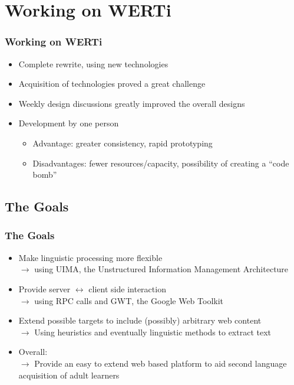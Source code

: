 \documentclass{beamer}
\begin{document}
\section{Working on WERTi}
\begin{frame}
  \frametitle{Working on WERTi}
  \begin{itemize}
    \item Complete rewrite, using new technologies\pause
    \item Acquisition of technologies proved a great challenge\pause
    \item Weekly design discussions greatly improved the overall designs
    \item Development by one person\pause
      \begin{itemize}
	\item Advantage: greater consistency, rapid prototyping\pause
	\item Disadvantages: fewer resources/capacity, possibility of creating a ``code bomb''\pause
      \end{itemize}
  \end{itemize}
\end{frame}
\subsection{The Goals}
\begin{frame}
  \frametitle{The Goals}
  \begin{itemize}
    \item Make linguistic processing more flexible\pause\\
      $\to$ using UIMA, the Unstructured Information Management Architecture\pause
    \item Provide server $\leftrightarrow$ client side interaction\pause\\
      $\to$ using RPC calls and GWT, the Google Web Toolkit\pause
    \item Extend possible targets to include (possibly) arbitrary web
      content\pause\\
      $\to$ Using heuristics and eventually linguistic methods to extract
      text\pause
    \item Overall:\pause\\
      $\to$ Provide an easy to extend web based platform to aid second language
      acquisition of adult learners
  \end{itemize}
\end{frame}
\end{document}
